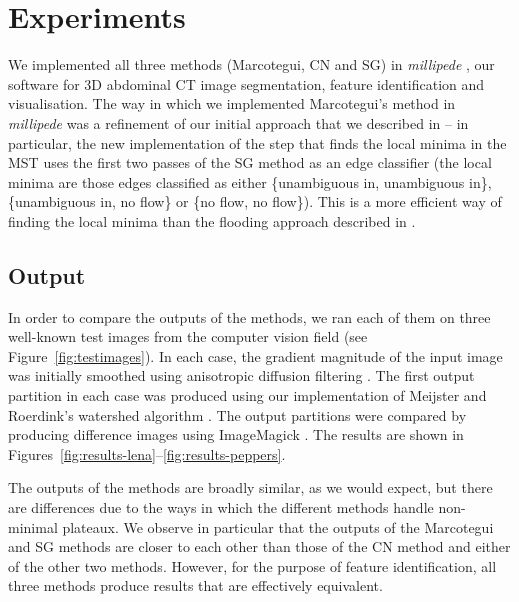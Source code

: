 \documentclass[preprint,a4paper]{elsarticle}
\begin{document}
\section{Experiments}
\label{sec:experiments}

We implemented all three methods (Marcotegui, CN and SG) in \emph{millipede} \cite{millipede}, our software for 3D abdominal CT image segmentation, feature identification and visualisation. The way in which we implemented Marcotegui's method in \emph{millipede} was a refinement of our initial approach that we described in \cite{golodetz08} -- in particular, the new implementation of the step that finds the local minima in the MST uses the first two passes of the SG method as an edge classifier (the local minima are those edges classified as either \{unambiguous in, unambiguous in\}, \{unambiguous in, no flow\} or \{no flow, no flow\}). This is a more efficient way of finding the local minima than the flooding approach described in \cite{golodetz08}.

\subsection{Output}

In order to compare the outputs of the methods, we ran each of them on three well-known test images from the computer vision field (see Figure~\ref{fig:testimages}). In each case, the gradient magnitude of the input image was initially smoothed using anisotropic diffusion filtering \cite{perona90}. The first output partition in each case was produced using our implementation of Meijster and Roerdink's watershed algorithm \cite{meijster98}. The output partitions were compared by producing difference images using ImageMagick \cite{imagemagick}. The results are shown in Figures~\ref{fig:results-lena}--\ref{fig:results-peppers}.

The outputs of the methods are broadly similar, as we would expect, but there are differences due to the ways in which the different methods handle non-minimal plateaux. We observe in particular that the outputs of the Marcotegui and SG methods are closer to each other than those of the CN method and either of the other two methods. However, for the purpose of feature identification, all three methods produce results that are effectively equivalent.
\end{document}
